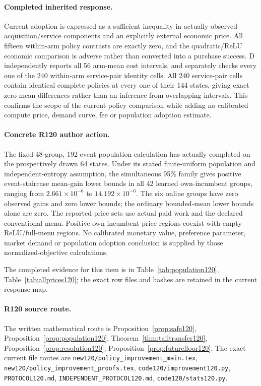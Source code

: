 \paragraph{Completed inherited response.}
Current adoption is expressed as a sufficient inequality in actually observed acquisition/service components and an explicitly external economic price. All fifteen within-arm policy contrasts are exactly zero, and the quadratic/ReLU economic comparison is adverse rather than converted into a purchase success. D independently reports all 56 arm-mean cost intervals, and separately checks every one of the 240 within-arm service-pair identity cells. All 240 service-pair cells contain identical complete policies at every one of their 144 states, giving exact zero mean differences rather than an inference from overlapping intervals. This confirms the scope of the current policy comparison while adding no calibrated compute price, demand curve, fee or population adoption estimate.
\paragraph{Concrete R120 author action.}
The fixed 48-group, 192-event population calculation has actually completed on the prospectively drawn 64 states. Under its stated finite-uniform population and independent-entropy assumption, the simultaneous 95\% family gives positive event-staircase mean-gain lower bounds in all 42 learned own-incumbent groups, ranging from $2.661\times10^{-6}$ to $14.192\times10^{-6}$. The six online groups have zero observed gains and zero lower bounds; the ordinary bounded-mean lower bounds alone are zero. The reported price sets use actual paid work and the declared conventional menu. Positive own-incumbent price regions coexist with empty ReLU/full-menu regions. No calibrated monetary value, preference parameter, market demand or population adoption conclusion is supplied by those normalized-objective calculations.

The completed evidence for this item is in Table~\ref{tab:population120}, Table~\ref{tab:allprices120}; the exact row files and hashes are retained in the current response map.
\paragraph{R120 source route.}
The written mathematical route is Proposition~\ref{prop:safe120}, Proposition~\ref{prop:population120}, Theorem~\ref{thm:tailtransfer120}, Proposition~\ref{prop:resolution120}, Proposition~\ref{prop:futurefloor120}. The exact current file routes are \nolinkurl{new120/policy_improvement_main.tex}, \nolinkurl{new120/policy_improvement_proofs.tex}, \nolinkurl{code120/improvement120.py}, \nolinkurl{PROTOCOL120.md}, \nolinkurl{INDEPENDENT_PROTOCOL120.md}, \nolinkurl{code120/stats120.py}.
